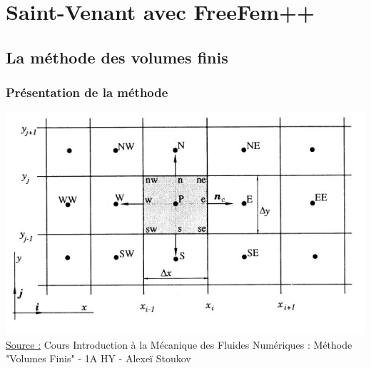 \documentclass[handout]{beamer}
\begin{document}
\section[FreeFem++]{Saint-Venant avec FreeFem++}
\subsection[Volumes finis]{La méthode des volumes finis}
\begin{frame}
	\frametitle{Présentation de la méthode}
	\centering \includegraphics[scale=0.62]{3.jpg}\\
	\tiny{\underline{Source :} Cours Introduction à la Mécanique des Fluides Numériques : Méthode "Volumes Finis" - 1A HY - Alexeï Stoukov}
\end{frame}
\end{document}
